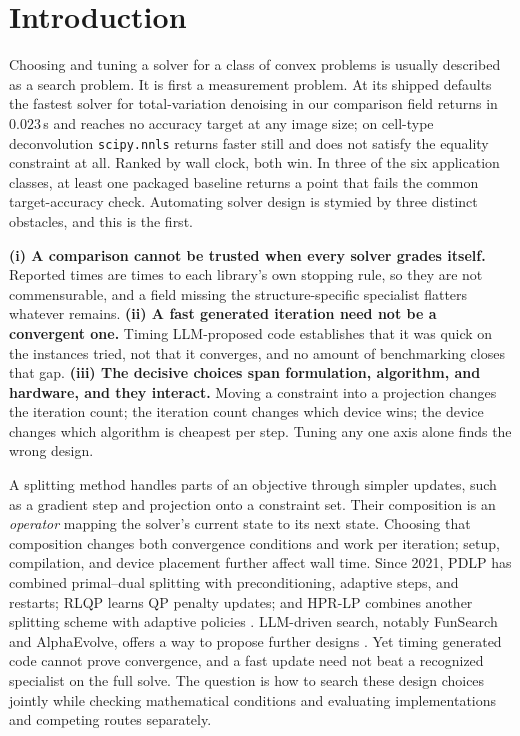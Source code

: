 \section{Introduction}
\label{sec:introduction}

Choosing and tuning a solver for a class of convex problems is usually described as a
search problem. It is first a measurement problem. At its shipped defaults the fastest
solver for total-variation denoising in our comparison field returns in $0.023$\,s and
reaches no accuracy target at any image size; on cell-type deconvolution
\texttt{scipy.nnls} returns faster still and does not satisfy the equality constraint at
all. Ranked by wall clock, both win. In three of the six application classes,
at least one packaged baseline returns a point that fails the common
target-accuracy check.
Automating solver design is stymied by three distinct obstacles, and this is
the first.

\textbf{(i) A comparison cannot be trusted when every solver grades itself.} Reported
times are times to each library's own stopping rule, so they are not commensurable, and
a field missing the structure-specific specialist flatters whatever remains.
\textbf{(ii) A fast generated iteration need not be a convergent one.} Timing
LLM-proposed code establishes that it was quick on the instances tried, not that it
converges, and no amount of benchmarking closes that gap.
\textbf{(iii) The decisive choices span formulation, algorithm, and hardware, and they
interact.} Moving a constraint into a projection changes the iteration count; the
iteration count changes which device wins; the device changes which algorithm is
cheapest per step. Tuning any one axis alone finds the wrong design.

A splitting method handles parts of an objective through simpler updates, such as a gradient step and projection onto a constraint set. Their composition is an \emph{operator} mapping the solver's current state to its next state. Choosing that composition changes both convergence conditions and work per iteration; setup, compilation, and device placement further affect wall time. Since 2021, PDLP has combined primal--dual splitting with preconditioning, adaptive steps, and restarts; RLQP learns QP penalty updates; and HPR-LP combines another splitting scheme with adaptive policies \citep{Applegate2021Practical,Ichnowski2021Accelerating,Chen2024HPRLP}. LLM-driven search, notably FunSearch and AlphaEvolve, offers a way to propose further designs \citep{RomeraParedes2023Mathematical,Novikov2025AlphaEvolve}. Yet timing generated code cannot prove convergence, and a fast update need not beat a recognized specialist on the full solve. The question is how to search these design choices jointly while checking mathematical conditions and evaluating implementations and competing routes separately.

